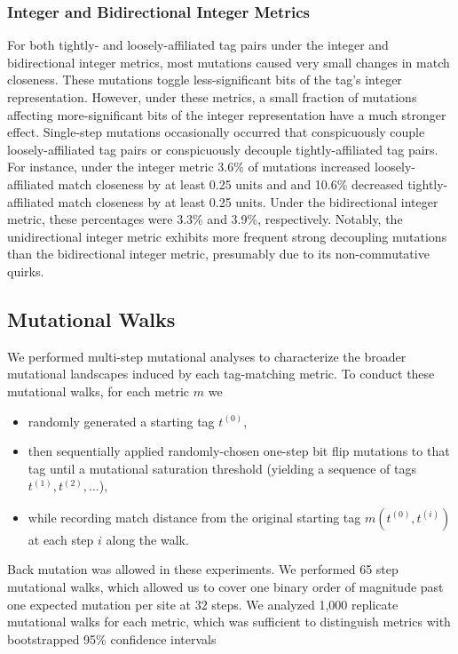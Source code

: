 \subsubsection{Integer and Bidirectional Integer Metrics}

For both tightly- and loosely-affiliated tag pairs under the integer and bidirectional integer metrics, most mutations caused very small changes in match closeness.
These mutations toggle less-significant bits of the tag's integer representation.
However, under these metrics, a small fraction of mutations affecting more-significant bits of the integer representation have a much stronger effect.
Single-step mutations occasionally occurred that conspicuously couple loosely-affiliated tag pairs or conspicuously decouple tightly-affiliated tag pairs.
For instance, under the integer metric 3.6\% of mutations increased loosely-affiliated match closeness by at least 0.25 units and and 10.6\% decreased tightly-affiliated match closeness by at least 0.25 units.
Under the bidirectional integer metric, these percentages were 3.3\% and 3.9\%, respectively.
Notably, the unidirectional integer metric exhibits more frequent strong decoupling mutations than the bidirectional integer metric, presumably due to its non-commutative quirks.

\subsection{Mutational Walks} \label{sec:mutational_walks}



We performed multi-step mutational analyses to characterize the broader mutational landscapes induced by each tag-matching metric.
To conduct these mutational walks, for each metric $m$ we
\begin{itemize}
    \item randomly generated a starting tag $t^{(0)}$,
    \item then sequentially applied randomly-chosen one-step bit flip mutations to that tag until a mutational saturation threshold (yielding a sequence of tags $t^{(1)}, t^{(2)}, ...$),
    \item while recording match distance from the original starting tag $m(t^{(0)}, t^{(i)})$ at each step $i$ along the walk.
\end{itemize}
Back mutation was allowed in these experiments.
We performed 65 step mutational walks, which allowed us to cover one binary order of magnitude past one expected mutation per site at 32 steps.
We analyzed 1,000 replicate mutational walks for each metric, which was sufficient to distinguish metrics with bootstrapped 95\% confidence intervals

